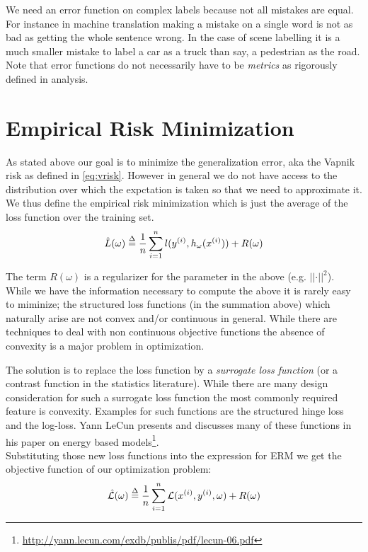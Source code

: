 We need an error function on complex labels because not all mistakes are equal.
For instance in machine translation making a mistake on a single word is not as
bad as getting the whole sentence wrong. In the case of scene labelling it is a
much smaller mistake to label a car as a truck than say, a pedestrian as the
road. Note that error functions do not necessarily have to be \emph{metrics}
as rigorously defined in analysis.

\section{Empirical Risk Minimization}
As stated above our goal is to minimize the generalization error, aka the
Vapnik risk as defined in \eqref{eq:vrisk}. However in general we do not have
access to the distribution over which the expctation is taken so that we
need to approximate it. We thus define the empirical risk minimization
which is just the average of the loss function over the training set.
\begin{equation}
    \hat L(\omega) \mathrel{\stackrel{\Delta}{=}} \frac{1}{n}\sum_{i=1}^n l(y^{(i)},h_{\omega}(x^{(i)}))
    + R(\omega) \label{eq:erm}
\end{equation} 

The term $R(\omega)$ is a regularizer for the parameter in the above (e.g.
$\vert \vert \cdot \vert \vert ^2$). While we have the information necessary to
compute the above it is rarely easy to miminize; the structured loss functions
(in the summation above) which naturally arise are not convex and/or continuous
in general. While there are techniques to deal with non continuous objective
functions the absence of convexity is a major problem in optimization. 

The solution is to replace the loss function by a \emph{surrogate loss
function} (or a contrast function in the statistics literature).  While there
are many design consideration for such a surrogate loss function the most
commonly required feature is convexity. Examples for such functions
are the structured hinge loss and the log-loss. Yann LeCun 
presents and discusses many of these functions in his paper on energy based
models\footnote{\url{http://yann.lecun.com/exdb/publis/pdf/lecun-06.pdf}}.\\

Substituting those new loss functions into the expression for ERM we 
get the objective function of our optimization problem:
\begin{equation}
    \hat{\mathcal L}(\omega) \mathrel{\stackrel{\Delta}{=}} \frac{1}{n}\sum_{i=1}^n
    \mathcal L (x^{(i)},y^{(i)},\omega)
    + R(\omega) \label{eq:surrogate}
\end{equation}

